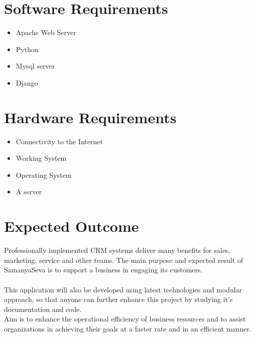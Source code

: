 \section{Software Requirements}
\begin{itemize}
	\item Apache Web Server
	\item Python
	\item Mysql server
	\item Django
	\end{itemize}



\section{Hardware Requirements}
\begin{itemize}
\item Connectivity to the Internet
\item Working System
\item Operating System
\item A server
	\end{itemize}

	\section{Expected Outcome}

Professionally implemented CRM systems deliver many benefits for sales, marketing, service and other teams.
The main purpose and expected result of SamanyaSeva is to support a business in engaging its customers.\\\\
This application will also be developed using latest technologies and modular approach, so that anyone can further enhance this project by studying it's documentation and code.\\
Aim is to enhance the operational efficiency of business resources and to assist organizations in achieving their goals at a faster rate and in an efficient manner.

